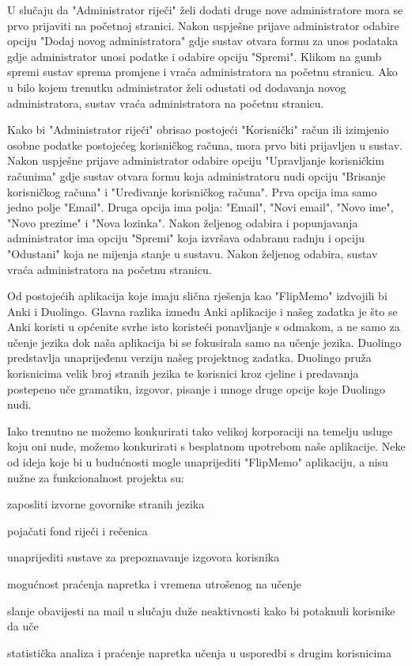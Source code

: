 U slučaju da "Administrator riječi" želi dodati druge nove administratore mora se prvo prijaviti na početnoj stranici. Nakon uspješne prijave administrator odabire opciju "Dodaj novog administratora"
gdje sustav otvara formu za unos podataka gdje administrator unosi podatke i odabire opciju "Spremi". Klikom na gumb spremi sustav sprema promjene i vraća administratora na početnu stranicu. 
Ako u bilo kojem trenutku administrator želi odustati od dodavanja novog administratora, sustav vraća administratora na početnu stranicu.

Kako bi "Administrator riječi" obrisao postojeći "Korisnički" račun ili izimjenio osobne podatke postojećeg korisničkog računa, mora prvo biti prijavljen u sustav. Nakon uspješne prijave administrator odabire opciju "Upravljanje korisničkim računima" gdje sustav otvara formu koja administratoru nudi opciju "Brisanje korisničkog računa" i "Uređivanje korisničkog računa". Prva opcija ima samo jedno polje "Email". Druga opcija ima polja: "Email", "Novi email", "Novo ime", "Novo prezime" i "Nova lozinka". Nakon željenog odabira i popunjavanja administrator ima opciju "Spremi" koja izvršava odabranu radnju i opciju "Odustani" koja ne mijenja stanje u sustavu. Nakon željenog odabira, sustav vraća administratora na početnu stranicu.

Od postojećih aplikacija koje imaju slična rješenja kao "FlipMemo" izdvojili bi Anki i Duolingo. Glavna razlika između Anki aplikacije i našeg zadatka je što se Anki koristi u općenite svrhe isto koristeći ponavljanje s odmakom, a ne samo za učenje jezika dok naša aplikacija bi se fokusirala samo na učenje jezika. Duolingo predstavlja unaprijeđenu verziju našeg projektnog zadatka. Duolingo pruža korisnicima velik broj stranih jezika te korisnici kroz cjeline i predavanja postepeno uče gramatiku, izgovor, pisanje i mnoge druge opcije koje Duolingo nudi. 

Iako trenutno ne možemo konkurirati tako velikoj korporaciji na temelju usluge koju oni nude, možemo konkurirati s besplatnom upotrebom naše aplikacije. Neke od ideja koje bi u budućnosti mogle unaprijediti "FlipMemo" aplikaciju, a nisu nužne za funkcionalnost projekta su:

\begin{packed_item}
	\item  zaposliti izvorne govornike stranih jezika 
	\item  pojačati fond riječi i rečenica
	\item  unaprijediti sustave za prepoznavanje izgovora korisnika
	\item  mogućnost praćenja napretka i vremena utrošenog na učenje 
	\item  slanje obavijesti na mail u slučaju duže neaktivnosti kako bi potaknuli korisnike da uče
	\item  statistička analiza i praćenje napretka učenja u usporedbi s drugim korisnicima 
\end{packed_item}


